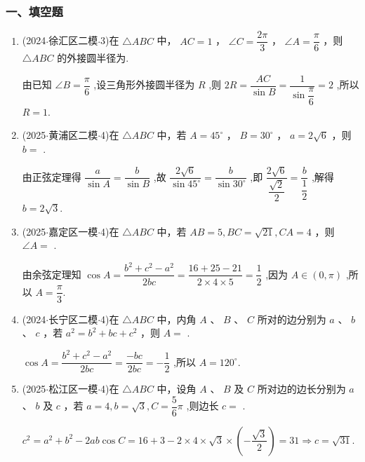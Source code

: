 \subsubsection*{一、填空题}
\begin{enumerate}
    \item (2024$\cdot$徐汇区二模$\cdot$3)在 $\bigtriangleup  {ABC}$ 中， ${AC} = 1$ ， $\angle C = \dfrac{2\pi }{3}$ ， $\angle A = \dfrac{\pi }{6}$ ，则 $\bigtriangleup  {ABC}$ 的外接圆半径为.
    \begin{jieda}
        由已知 $\angle B = \dfrac{\pi }{6}$ ,设三角形外接圆半径为 $R$ ,则 ${2R} =  \dfrac{AC}{\sin B} = \dfrac{1}{\sin \dfrac{\pi }{6}} = 2$ ,所以 $R = 1$.
    \end{jieda}

    \item (2025$\cdot$黄浦区二模$\cdot$4)在 $\bigtriangleup  {ABC}$ 中，若 $A = {45}^{ \circ  }$ ， $B = {30}^{ \circ  }$ ， $a = 2\sqrt{6}$ ，则 $b =$ .
    \begin{jieda}
        由正弦定理得 $\dfrac{a}{\sin A} = \dfrac{b}{\sin B}$ ,故 $\dfrac{2\sqrt{6}}{\sin {45}^{ \circ  }} = \dfrac{b}{\sin {30}^{ \circ  }}$ ,即 $\dfrac{2\sqrt{6}}{\dfrac{\sqrt{2}}{2}} = \dfrac{b}{\dfrac{1}{2}}$ ,解得 $b = 2\sqrt{3}$.
    \end{jieda}

    \item (2025$\cdot$嘉定区一模$\cdot$4)在 $\bigtriangleup  {ABC}$ 中，若 ${AB} = 5,{BC} = \sqrt{21},{CA} = 4$ ，则 $\angle A =$ .
    \begin{jieda}
        由余弦定理知 $\cos A = \dfrac{{b}^{2} + {c}^{2} - {a}^{2}}{2bc} = \dfrac{{16} + {25} - {21}}{2 \times  4 \times  5} =  \dfrac{1}{2}$ ,因为 $A \in  \left( {0,\pi }\right)$ ,所以 $A = \dfrac{\pi }{3}$.
    \end{jieda}

    \item (2024$\cdot$长宁区二模$\cdot$4)在 $\bigtriangleup  {ABC}$ 中，内角 $A$ 、 $B$ 、 $C$ 所对的边分别为 $a$ 、 $b$ 、 $c$ ，若 ${a}^{2} = {b}^{2} + {bc} + {c}^{2}$ ，则 $A =$ .
    \begin{jieda}
        $\cos A = \dfrac{{b}^{2} + {c}^{2} - {a}^{2}}{2bc} = \dfrac{-{bc}}{2bc} =  - \dfrac{1}{2}$ ,所以 $A = {120}^{ \circ  }$.
    \end{jieda}

    \item (2025$\cdot$松江区一模$\cdot$4)在 $\bigtriangleup  {ABC}$ 中，设角 $A$ 、 $B$ 及 $C$ 所对边的边长分别为 $a$ 、 $b$ 及 $c$ ，若 $a = 4,b =  \sqrt{3},C = \dfrac{5}{6}\pi$ ,则边长 $c =$ .
    \begin{jieda}
        ${c}^{2} = {a}^{2} + {b}^{2} - {2ab}\cos C = {16} + 3 - 2 \times  4 \times  \sqrt{3} \times  \left( {-\dfrac{\sqrt{3}}{2}}\right)  = {31} \Longrightarrow  c = \sqrt{31}.$
    \end{jieda}


\end{enumerate}
